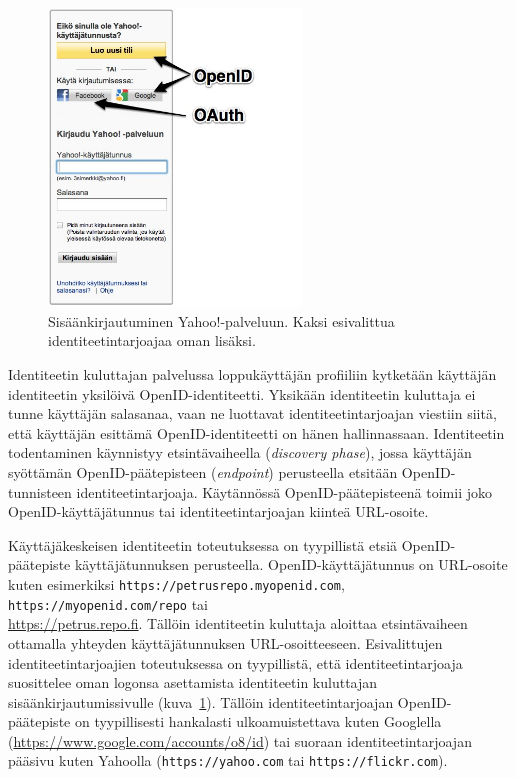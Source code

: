 \documentclass[finnish,gradu]{tktltiki}
\begin{document}
  \begin{figure}[h!]
    \centering
    \includegraphics[width=0.6\textwidth]{images/yahoo_login.jpg}
    \caption{Sisäänkirjautuminen Yahoo!-palveluun. Kaksi esivalittua identiteetintarjoajaa oman lisäksi.}
    \label{fig:yahoo_login}
  \end{figure}

  Identiteetin kuluttajan palvelussa loppukäyttäjän profiiliin kytketään käyttäjän identiteetin yksilöivä OpenID-identiteetti. Yksikään identiteetin kuluttaja ei tunne käyttäjän salasanaa, vaan ne luottavat identiteetintarjoajan viestiin siitä, että käyttäjän esittämä OpenID-identiteetti on hänen hallinnassaan.  Identiteetin todentaminen käynnistyy etsintävaiheella (\emph{discovery phase}), jossa käyttäjän syöttämän OpenID-päätepisteen (\emph{endpoint}) perusteella etsitään OpenID-tunnisteen identiteetintarjoaja. Käytännössä OpenID-päätepisteenä toimii joko OpenID-käyttäjätunnus tai identiteetintarjoajan kiinteä URL-osoite.

  Käyttäjäkeskeisen identiteetin toteutuksessa on tyypillistä etsiä OpenID-päätepiste käyttäjätunnuksen perusteella. OpenID-käyttäjätunnus on URL-osoite kuten esimerkiksi \verb!https://petrusrepo.myopenid.com!, \verb!https://myopenid.com/repo! tai
  \\ \url{https://petrus.repo.fi}. Tällöin identiteetin kuluttaja aloittaa etsintävaiheen ottamalla yhteyden käyttäjätunnuksen URL-osoitteeseen. Esivalittujen identiteetintarjoajien toteutuksessa on tyypillistä, että identiteetintarjoaja suosittelee oman logonsa asettamista identiteetin kuluttajan sisäänkirjautumissivulle (kuva~\ref{fig:yahoo_login}). Tällöin identiteetintarjoajan OpenID-päätepiste on tyypillisesti hankalasti ulkoamuistettava kuten Googlella
  \\ (\url{https://www.google.com/accounts/o8/id}) tai suoraan identiteetintarjoajan pääsivu kuten Yahoolla (\verb!https://yahoo.com! tai \verb!https://flickr.com!).
\end{document}
